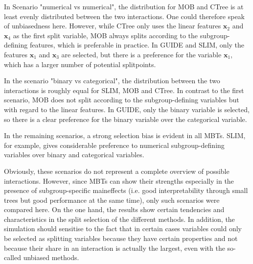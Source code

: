In Scenario "numerical vs numerical", the distribution for MOB and CTree is at least evenly distributed between the two interactions. One could therefore speak of unbiasedness here. However, while CTree only uses the linear features $\textbf{x}_2$ and $\textbf{x}_4$ as the first split variable, MOB always splits according to the subgroup-defining features, which is preferable in practice.
In GUIDE and SLIM, only the features $\textbf{x}_1$ and $\textbf{x}_3$ are selected, but there is a preference for the variable $\textbf{x}_1$, which has a larger number of potential splitpoints.


In the scenario "binary vs categorical", the distribution between the two interactions is roughly equal for SLIM, MOB and CTree. In contrast to the first scenario, MOB does not split according to the subgroup-defining variables but with regard to the linear features.
In GUIDE, only the binary variable is selected, so there is a clear preference for the binary variable over the categorical variable.

In the remaining scenarios, a strong selection bias is evident in all MBTs. SLIM, for example, gives considerable preference to numerical subgroup-defining variables over binary and categorical variables.





Obviously, these scenarios do not represent a complete overview of possible interactions. However, since MBTs can show their strengths especially in the presence of subgroup-specific maineffects (i.e. good interpretability through small trees but good performance at the same time), only such scenarios were compared here. On the one hand, the results show certain tendencies and characteristics in the split selection of the different methods. In addition, the simulation should sensitise to the fact that in certain cases variables could only be selected as splitting variables because they have certain properties and not because their share in an interaction is actually the largest, even with the so-called unbiased methods.









